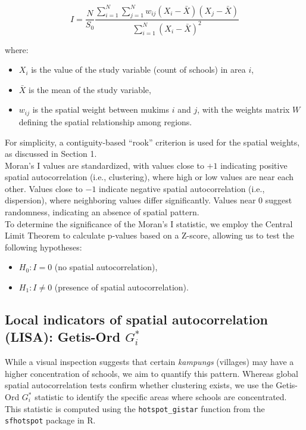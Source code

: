 \documentclass [12 pt]{article}
\begin{document}
\begin{equation}
I = \frac{N}{S_0} \frac{\sum_{i=1}^N \sum_{j=1}^N w_{ij} (X_i - \bar{X})(X_j - \bar{X})}{\sum_{i=1}^N (X_i - \bar{X})^2}
\end{equation}

where:
\begin{itemize}
    \item \( X_i \) is the value of the study variable (count of schools) in area \( i \),
    \item \( \bar{X} \) is the mean of the study variable,
    \item \( w_{ij} \) is the spatial weight between mukims \( i \) and \( j \), with the weights matrix \( W \) defining the spatial relationship among regions.
\end{itemize}

For simplicity, a contiguity-based “rook” criterion is used for the spatial weights, as discussed in Section 1. %
\\

Moran’s I values are standardized, with values close to \(+1\) indicating positive spatial autocorrelation (i.e., clustering), where high or low values are near each other. Values close to \(-1\) indicate negative spatial autocorrelation (i.e., dispersion), where neighboring values differ significantly. Values near \(0\) suggest randomness, indicating an absence of spatial pattern. \\

To determine the significance of the Moran’s I statistic, we employ the Central Limit Theorem to calculate p-values based on a Z-score, allowing us to test the following hypotheses:
\begin{itemize}
    \item \( H_0: I = 0 \) (no spatial autocorrelation),
    \item \( H_1: I \neq 0 \) (presence of spatial autocorrelation).
\end{itemize}




\subsection{Local indicators of spatial autocorrelation (LISA): Getis-Ord \( G_i^* \)}
While a visual inspection suggests that certain \textit{kampungs} (villages) may have a higher concentration of schools, we aim to quantify this pattern. Whereas global spatial autocorrelation tests confirm whether clustering exists, we use the Getis-Ord \( G_i^* \) statistic to identify the specific areas where schools are concentrated. This statistic is computed using the \texttt{hotspot\_gistar} function from the \texttt{sfhotspot} package in R. \\
\end{document}
